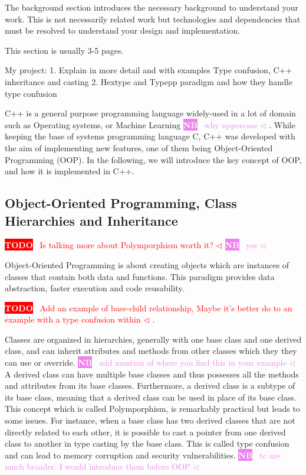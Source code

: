 \documentclass[a4paper,11pt,oneside]{report}
\newcommand{\todobox}[3]{%
       \colorbox{#1}{\textcolor{white}{\sffamily\bfseries\scriptsize #2}}%
       ~\textcolor{#1}{#3} %
       \textcolor{#1}{$\triangleleft$}%
}
\newcommand{\nb}[1]{\todobox{violet}{NB}{#1}}
\newcommand{\adrbqt}[1]{\todobox{red}{TODO}{#1}}
\begin{document}
The background section introduces the necessary background to understand your
work. This is not necessarily related work but technologies and dependencies
that must be resolved to understand your design and implementation.

This section is usually 3-5 pages.

My project:
1. Explain in more detail and with examples Type confusion, C++ inheritance and casting
2. Hextype and Typepp paradigm and how they handle type confusion

C++ is a general purpose programming language widely-used in a lot of domain such as Operating systems, 
or Machine Learning \nb{why uppercase}. While keeping the base of systems programming language C, C++ was developed with the aim of 
implementing new features, one of them being Object-Oriented Programming (OOP). In the following, we will introduce the key 
concept of OOP, and how it is implemented in C++. 

\subsection{Object-Oriented Programming, Class Hierarchies and Inheritance}
\adrbqt{Is talking more about Polymporphism worth it?}\nb{yes}
Object-Oriented Programming is about creating objects which are instances of classes that contain both data and functions. This paradigm provides
data abstraction, faster execution and code reusability. 

\adrbqt{Add an example of base-child relationship, Maybe it's better do to an example with a type confusion within}.

Classes are organized in hierarchies, generally with one base class and one derived class, and can inherit attributes and methods from other classes which they
they can use or override. \nb{add mention of where you find this in your example}A derived class can have multiple base classes and thus possesses all the methods and attributes from its base classes. 
Furthermore, a derived class is a subtype of its base class, meaning that a derived class can be used in place of its base class. This concept which is called 
Polymporphism, is remarkably practical but leads to some issues. For instance, when a base class has two derived classes that are not directly related to each other, 
it is possible to cast a pointer from one derived class to another in type casting by the base class.
This is called type confusion and can lead to memory corruption and security vulnerabilities. \nb{tc are much broader. I would introduce them before OOP}
\end{document}
